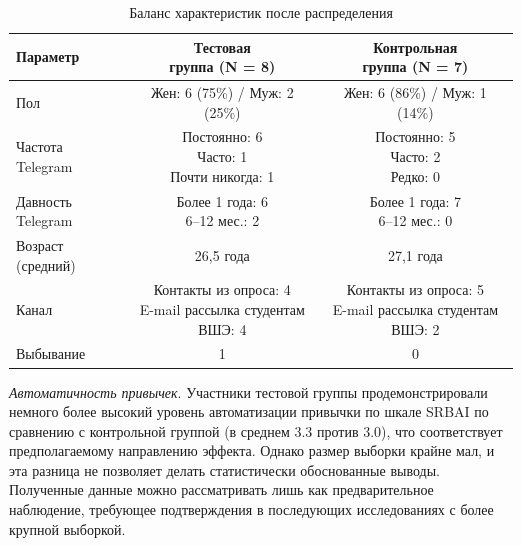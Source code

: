 \documentclass[pdflatex,sn-mathphys-num]{sn-jnl}%
\theoremstyle{thmstyleone}%
\theoremstyle{thmstyletwo}%
\theoremstyle{thmstylethree}%
\begin{document}
\begin{table}[ht]
  \centering
  \caption{Баланс характеристик после распределения}
  \label{tab:rct_groups}
  \begin{tabular}{@{} l c c @{}}
    \toprule
    Параметр 
      & \parbox[c]{4cm}{\centering Тестовая\\группа (N = 8)} 
      & \parbox[c]{4cm}{\centering Контрольная\\группа (N = 7)} \\
    \midrule
    Пол 
      & Жен: 6 (75\%) / Муж: 2 (25\%) 
      & Жен: 6 (86\%) / Муж: 1 (14\%) \\

    Частота Telegram 
      & \parbox[t]{4cm}{Постоянно: 6\\ Часто: 1\\ Почти никогда: 1} 
      & \parbox[t]{4cm}{Постоянно: 5\\ Часто: 2\\ Редко: 0} \\

    Давность Telegram 
      & \parbox[t]{4cm}{Более 1 года: 6\\ 6--12 мес.: 2} 
      & \parbox[t]{4cm}{Более 1 года: 7\\ 6--12 мес.: 0} \\

    Возраст (средний) 
      & 26,5 года 
      & 27,1 года \\

      Канал 
      & \parbox[t]{4cm}{Контакты из опроса: 4\\ E-mail рассылка студентам ВШЭ: 4} 
      & \parbox[t]{4cm}{Контакты из опроса: 5\\ E-mail рассылка студентам ВШЭ: 2}  \\
    Выбывание 
      & 1 
      & 0 \\
    \bottomrule
  \end{tabular}
\end{table}

\textit{Автоматичность привычек}. Участники тестовой группы продемонстрировали немного более высокий уровень автоматизации привычки по шкале SRBAI по сравнению с контрольной группой (в среднем 3.3 против 3.0), что соответствует предполагаемому направлению эффекта. Однако размер выборки крайне мал, и эта разница не позволяет делать статистически обоснованные выводы. Полученные данные можно рассматривать лишь как предварительное наблюдение, требующее подтверждения в последующих исследованиях с более крупной выборкой.
\end{document}
